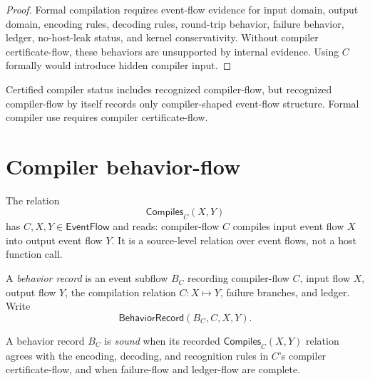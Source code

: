 \begin{proof}
Formal compilation requires event-flow evidence for input domain, output domain, encoding rules, decoding rules, round-trip behavior, failure behavior, ledger, no-host-leak status, and kernel conservativity. Without compiler certificate-flow, these behaviors are unsupported by internal evidence. Using $C$ formally would introduce hidden compiler input.
\end{proof}

\begin{corollary}
\label{cor:self-hosting-recognized-weaker-than-certified}
Certified compiler status includes recognized compiler-flow, but recognized compiler-flow by itself records only compiler-shaped event-flow structure. Formal compiler use requires compiler certificate-flow.
\end{corollary}

\section{Compiler behavior-flow}
\label{sec:self-hosting-behavior}

\begin{definition}
\label{def:self-hosting-p9-compiler-behavior-relation}
The relation
$$
  \mathsf{Compiles}_{C}(X,Y)
$$
has $C,X,Y\in\mathsf{EventFlow}$ and reads: compiler-flow $C$ compiles input event flow $X$ into output event flow $Y$. It is a source-level relation over event flows, not a host function call.
\end{definition}

\begin{definition}
\label{def:self-hosting-behavior-record}
A \emph{behavior record} is an event subflow $B_C$ recording compiler-flow $C$, input flow $X$, output flow $Y$, the compilation relation $C:X\mapsto Y$, failure branches, and ledger. Write
$$
  \mathsf{BehaviorRecord}(B_C,C,X,Y).
$$
\end{definition}

\begin{definition}
\label{def:self-hosting-behavior-soundness}
A behavior record $B_C$ is \emph{sound} when its recorded $\mathsf{Compiles}_{C}(X,Y)$ relation agrees with the encoding, decoding, and recognition rules in $C$'s compiler certificate-flow, and when failure-flow and ledger-flow are complete.
\end{definition}

